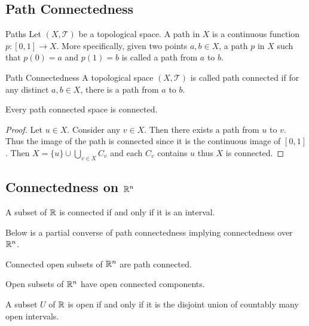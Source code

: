 \documentclass[a4paper]{article}
\begin{document}
\subsection{Path Connectedness}
\begin{defn}{Paths}{} Let $(X,\mathcal{T})$ be a topological space. A path in $X$ is a continuous function $p:[0,1]\to X$. More specifically, given two points $a,b\in X$, a path $p$ in $X$ such that $p(0)=a$ and $p(1)=b$ is called a path from $a$ to $b$. 
\end{defn}

\begin{defn}{Path Connectedness}{} A topological space $(X,\mathcal{T})$ is called path connected if for any distinct $a,b\in X$, there is a path from $a$ to $b$. 
\end{defn}

\begin{prp}{}{} Every path connected space is connected. 
\begin{proof}
Let $u\in X$. Consider any $v\in X$. Then there exists a path from $u$ to $v$. Thus the image of the path is connected since it is the continuous image of $[0,1]$. Then $X=\{u\}\cup\bigcup_{v\in X}C_v$ and each $C_v$ contains $u$ thus $X$ is connected. 
\end{proof}
\end{prp}

\subsection{Connectedness on $\mathbb{R}^n$}
\begin{thm}{}{} A subset of $\mathbb{R}$ is connected if and only if it is an interval. 
\end{thm}

Below is a partial converse of path connectedness implying connectedness over $\mathbb{R}^n$. 

\begin{thm}{}{} Connected open subsets of $\mathbb{R}^n$ are path connected. 
\end{thm}

\begin{thm}{}{} Open subsets of $\mathbb{R}^n$ have open connected components. 
\end{thm}

\begin{thm}{}{} A subset $U$ of $\mathbb{R}$ is open if and only if it is the disjoint union of countably many open intervals. 
\end{thm}
\end{document}
